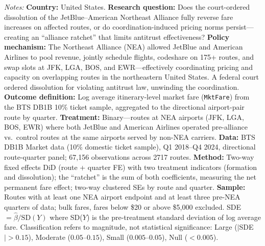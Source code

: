 \begin{table}[H]
\begin{threeparttable}
{\begin{flushleft}
\textit{Notes:} \textbf{Country:} United States. \textbf{Research question:} Does the court-ordered dissolution of the JetBlue--American Northeast Alliance fully reverse fare increases on affected routes, or do coordination-induced pricing norms persist---creating an ``alliance ratchet'' that limits antitrust effectiveness? \textbf{Policy mechanism:} The Northeast Alliance (NEA) allowed JetBlue and American Airlines to pool revenue, jointly schedule flights, codeshare on 175+ routes, and swap slots at JFK, LGA, BOS, and EWR---effectively coordinating pricing and capacity on overlapping routes in the northeastern United States. A federal court ordered dissolution for violating antitrust law, unwinding the coordination. \textbf{Outcome definition:} Log average itinerary-level market fare (\texttt{MktFare}) from the BTS DB1B 10\% ticket sample, aggregated to the directional airport-pair route by quarter. \textbf{Treatment:} Binary---routes at NEA airports (JFK, LGA, BOS, EWR) where both JetBlue and American Airlines operated pre-alliance vs.\ control routes at the same airports served by non-NEA carriers. \textbf{Data:} BTS DB1B Market data (10\% domestic ticket sample), Q1 2018--Q4 2024, directional route-quarter panel; 67,156 observations across 2717 routes. \textbf{Method:} Two-way fixed effects DiD (route + quarter FE) with two treatment indicators (formation and dissolution); the ``ratchet'' is the sum of both coefficients, measuring the net permanent fare effect; two-way clustered SEs by route and quarter. \textbf{Sample:} Routes with at least one NEA airport endpoint and at least three pre-NEA quarters of data; bulk fares, fares below \$20 or above \$5{,}000 excluded. SDE $= \hat{\beta} / \text{SD}(Y)$ where SD($Y$) is the pre-treatment standard deviation of log average fare. Classification refers to magnitude, not statistical significance: Large ($|$SDE$| > 0.15$), Moderate ($0.05$--$0.15$), Small ($0.005$--$0.05$), Null ($< 0.005$).
\end{flushleft}}
\end{threeparttable}
\end{table}

